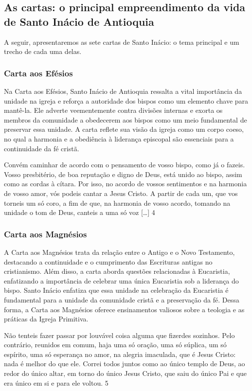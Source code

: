 \documentclass[a4paper,14pt]{extarticle} \usepackage[utf8]{inputenc}
\begin{document}
\subsection{As cartas: o principal empreendimento da vida de Santo Inácio de Antioquia}

A seguir, apresentaremos as sete cartas de Santo Inácio: o tema principal e um trecho de cada uma delas.
\subsubsection{Carta aos Efésios}

Na Carta aos Efésios, Santo Inácio de Antioquia ressalta a vital importância da unidade na igreja e reforça a autoridade dos bispos como um elemento chave para mantê-la. Ele adverte veementemente contra divisões internas e exorta os membros da comunidade a obedecerem aos bispos como um meio fundamental de preservar essa unidade. A carta reflete sua visão da igreja como um corpo coeso, no qual a harmonia e a obediência à liderança episcopal são essenciais para a continuidade da fé cristã.

Convém caminhar de acordo com o pensamento de vosso bispo, como já o fazeis. Vosso presbitério, de boa reputação e digno de Deus, está unido ao bispo, assim como as cordas à cítara. Por isso, no acordo de vossos sentimentos e na harmonia de vosso amor, vós podeis cantar a Jesus Cristo. A partir de cada um, que vos torneis um só coro, a fim de que, na harmonia de vosso acordo, tomando na unidade o tom de Deus, canteis a uma só voz […] 4
\subsubsection{Carta aos Magnésios}

A Carta aos Magnésios trata da relação entre o Antigo e o Novo Testamento, destacando a continuidade e o cumprimento das Escrituras antigas no cristianismo. Além disso, a carta aborda questões relacionadas à Eucaristia, enfatizando a importância de celebrar uma única Eucaristia sob a liderança do bispo. Santo Inácio enfatiza que essa unidade na celebração da Eucaristia é fundamental para a unidade da comunidade cristã e a preservação da fé. Dessa forma, a Carta aos Magnésios oferece ensinamentos valiosos sobre a teologia e as práticas da Igreja Primitiva.

Não tenteis fazer passar por louvável coisa alguma que fizerdes sozinhos. Pelo contrário, reunidos em comum, haja uma só oração, uma só súplica, um só espírito, uma só esperança no amor, na alegria imaculada, que é Jesus Cristo: nada é melhor do que ele. Correi todos juntos como ao único templo de Deus, ao redor do único altar, em torno do único Jesus Cristo, que saiu do único Pai e que era único em si e para ele voltou. 5
\end{document}

